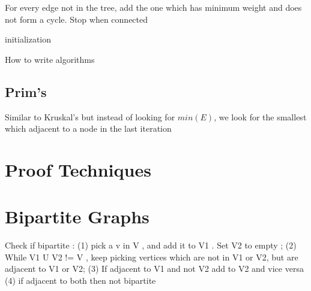 \documentclass[english,course]{Notes}
\begin{document}
\par{For every edge not in the tree, add the one which has minimum weight and does not form a cycle. Stop when connected}

\begin{algorithm}[H]
\SetAlgoLined{}
initialization\;
\caption{How to write algorithms}
\end{algorithm}






\subsection{Prim's}

\par{Similar to Kruskal's but instead of looking for $min(E)$, we look for the smallest which adjacent to a node in the last iteration}

\section
{Proof Techniques}


\section
{Bipartite Graphs}




\par{Check if bipartite : (1) pick a v in V , and add it to V1 . Set V2 to empty ; (2) While V1 U V2 != V , keep picking vertices which are not in V1 or V2, but are adjacent to V1 or V2; (3) If adjacent to V1 and not V2 add to V2 and vice versa (4) if adjacent to both then not bipartite}
\end{document}
